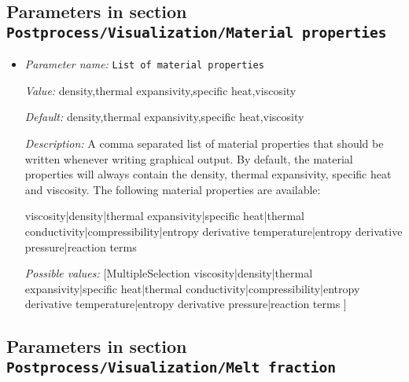 \subsection{Parameters in section \tt Postprocess/Visualization/Material properties}
\label{parameters:Postprocess/Visualization/Material_20properties}

\begin{itemize}
\item {\it Parameter name:} {\tt List of material properties}
\label{parameters:Postprocess/Visualization/Material properties/List of material properties}


{\it Value:} density,thermal expansivity,specific heat,viscosity


{\it Default:} density,thermal expansivity,specific heat,viscosity


{\it Description:} A comma separated list of material properties that should be written whenever writing graphical output. By default, the material properties will always contain the density, thermal expansivity, specific heat and viscosity. The following material properties are available:

viscosity|density|thermal expansivity|specific heat|thermal conductivity|compressibility|entropy derivative temperature|entropy derivative pressure|reaction terms


{\it Possible values:} [MultipleSelection viscosity|density|thermal expansivity|specific heat|thermal conductivity|compressibility|entropy derivative temperature|entropy derivative pressure|reaction terms ]
\end{itemize}

\subsection{Parameters in section \tt Postprocess/Visualization/Melt fraction}
\label{parameters:Postprocess/Visualization/Melt_20fraction}

